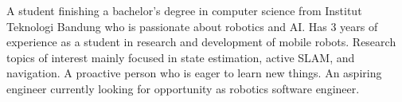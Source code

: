 

\begin{cvparagraph}
A student finishing a bachelor's degree in computer science from Institut Teknologi Bandung who is passionate about robotics and AI. Has 3 years of experience as a student in research and development of mobile robots. Research topics of interest mainly focused in state estimation, active SLAM, and navigation. A proactive person who is eager to learn new things. An aspiring engineer currently looking for opportunity as robotics software engineer.
\end{cvparagraph}
